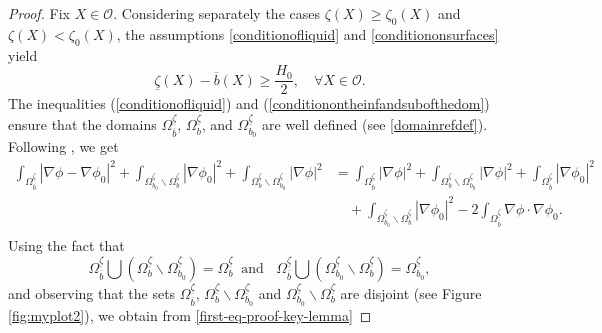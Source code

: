 \documentclass[11pt]{article}
\begin{document}
\begin{proof}
	Fix $X\in \mathcal{O}$. Considering separately the cases $\zeta(X)\ge \zeta_0(X)$ and $\zeta(X)<\zeta_0(X)$, the assumptions \eqref{conditionofliquid} and \eqref{conditiononsurfaces} yield
	\begin{equation}\label{conditionontheinfandsubofthedom}
		\underline{\zeta}(X)-\overline{b}(X)\geq \frac{H_0}{2},\quad \forall X\in \mathcal O .
	\end{equation}
	The inequalities (\ref{conditionofliquid}) and (\ref{conditionontheinfandsubofthedom}) ensure that the domains $\Omega_{\overline{b}}^{  \underline{\zeta}  }$, $\Omega_{b}^{  \underline{\zeta}  }$, and   $\Omega_{b_0}^{  \underline{\zeta}  }$  are well defined (see \eqref{domainrefdef}). Following \cite{kang1997inverse}, we get
	\begin{equation}\label{first-eq-proof-key-lemma}
		\begin{split}
			\displaystyle\int_{\Omega_{\overline{b}}^{  \underline{\zeta}  }}\left| \nabla\phi -\nabla\phi_0\right|^2+\displaystyle\int_{\Omega_{b_0}^{\underline{\zeta}}\backslash \Omega_{b}^{\underline{\zeta}}}\left|\nabla\phi_0\right|^2+\displaystyle\int_{\Omega_{b}^{\underline{\zeta}}\backslash \Omega_{b_0}^{\underline{\zeta}}}\left|\nabla\phi\right|^2
			&=\displaystyle\int_{\Omega_{\overline{b}}^{  \underline{\zeta}  }}\left| \nabla\phi\right|^2+\displaystyle\int_{\Omega_{b}^{\underline{\zeta}}\backslash \Omega_{b_0}^{\underline{\zeta}}}\left|\nabla\phi\right|^2+\displaystyle\int_{\Omega_{\overline{b}}^{  \underline{\zeta}  }}\left| \nabla\phi_0\right|^2\\&\quad+\displaystyle\int_{\Omega_{b_0}^{\underline{\zeta}}\backslash \Omega_{b}^{\underline{\zeta}}}\left|\nabla\phi_0\right|^2-2\displaystyle\int_{\Omega_{\overline{b}}^{\underline{\zeta}}}\nabla\phi\cdot\nabla\phi_0.\\
		\end{split}
	\end{equation}
	Using the fact that 
	$$\Omega_{\overline{b}}^{\underline{\zeta}}\bigcup\left(\Omega_{b}^{\underline{\zeta}}\backslash\Omega_{b_0}^{\underline{\zeta}}\right)=\Omega_{b}^{\underline{\zeta}}\;\;\text{and }\;\;\Omega_{\overline{b}}^{\underline{\zeta}}\bigcup\left(\Omega_{b_0}^{\underline{\zeta}}\backslash\Omega_{b}^{\underline{\zeta}}\right)=\Omega_{b_0}^{\underline{\zeta}},$$
	and observing that the sets $\Omega_{\overline{b}}^{\underline{\zeta}}$, $\Omega_{b}^{\underline{\zeta}}\backslash\Omega_{b_0}^{\underline{\zeta}}$ and $\Omega_{b_0}^{\underline{\zeta}}\backslash\Omega_{b}^{\underline{\zeta}}$ are disjoint (see Figure \ref{fig:myplot2}), we obtain from \eqref{first-eq-proof-key-lemma}

\end{proof}
\end{document}
